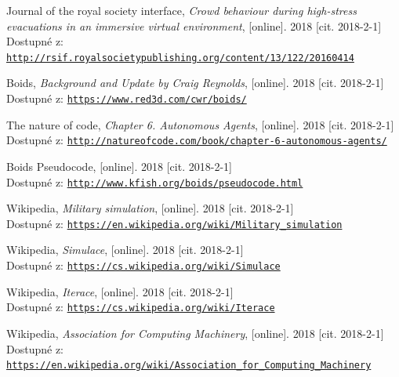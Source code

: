 \documentclass[czech,public,dept460,male,cpdeclaration]{diploma}
\begin{document}
\begin{thebibliography}{99}
	
	 Journal of the royal society interface, 
		\textit{Crowd behaviour during high-stress evacuations in an immersive virtual environment}, [online]. 2018 [cit. 2018-2-1]\\
		Dostupné z: \href{http://rsif.royalsocietypublishing.org/content/13/122/20160414}{\texttt{http://rsif.royalsocietypublishing.org/content/13/122/20160414}}
	
	 Boids, 
		\textit{Background and Update by Craig Reynolds}, [online]. 2018 [cit. 2018-2-1]\\
		Dostupné z: \href{https://www.red3d.com/cwr/boids/}{\texttt{https://www.red3d.com/cwr/boids/}}
	
	 The nature of code, 
		\textit{Chapter 6. Autonomous Agents}, [online]. 2018 [cit. 2018-2-1]\\
		Dostupné z: \href{http://natureofcode.com/book/chapter-6-autonomous-agents/}{\texttt{http://natureofcode.com/book/chapter-6-autonomous-agents/}}

	 Boids Pseudocode, 
		[online]. 2018 [cit. 2018-2-1]\\
		Dostupné z: \href{http://www.kfish.org/boids/pseudocode.html}{\texttt{http://www.kfish.org/boids/pseudocode.html}}
		
	 Wikipedia,
		\textit{Military simulation}, [online]. 2018 [cit. 2018-2-1]\\
		Dostupné z: \href{https://en.wikipedia.org/wiki/Military\_simulation}{\texttt{https://en.wikipedia.org/wiki/Military\_simulation}}
		
	 Wikipedia,
		\textit{Simulace}, [online]. 2018 [cit. 2018-2-1]\\
		Dostupné z: \href{https://cs.wikipedia.org/wiki/Simulace}{\texttt{https://cs.wikipedia.org/wiki/Simulace}}
		
	 Wikipedia,
		\textit{Iterace}, [online]. 2018 [cit. 2018-2-1]\\
		Dostupné z: \href{https://cs.wikipedia.org/wiki/Iterace}{\texttt{https://cs.wikipedia.org/wiki/Iterace}}
		
	 Wikipedia,
		\textit{Association for Computing Machinery}, [online]. 2018 [cit. 2018-2-1]\\
		Dostupné z: \href{https://en.wikipedia.org/wiki/Association\_for\_Computing\_Machinery}{\texttt{https://en.wikipedia.org/wiki/Association\_for\_Computing\_Machinery}}
		

\end{thebibliography}
\end{document}

